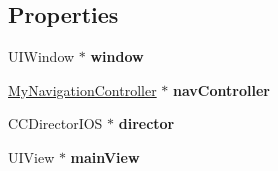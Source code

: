 \subsection*{Properties}
\begin{DoxyCompactItemize}
\item 
\hypertarget{interface_app_controller_a4b2762c205bc9701ffb112041e2eaad8}{U\-I\-Window $\ast$ {\bfseries window}}\label{interface_app_controller_a4b2762c205bc9701ffb112041e2eaad8}

\item 
\hypertarget{interface_app_controller_af56938679563d251337cea71cc67a03a}{\hyperlink{interface_my_navigation_controller}{My\-Navigation\-Controller} $\ast$ {\bfseries nav\-Controller}}\label{interface_app_controller_af56938679563d251337cea71cc67a03a}

\item 
\hypertarget{interface_app_controller_a1d442a183c35b99d7d86d4d25b3259eb}{C\-C\-Director\-I\-O\-S $\ast$ {\bfseries director}}\label{interface_app_controller_a1d442a183c35b99d7d86d4d25b3259eb}

\item 
\hypertarget{interface_app_controller_a099d0f0a3fc869706e2ec0fc3ccb315a}{U\-I\-View $\ast$ {\bfseries main\-View}}\label{interface_app_controller_a099d0f0a3fc869706e2ec0fc3ccb315a}

\end{DoxyCompactItemize}


